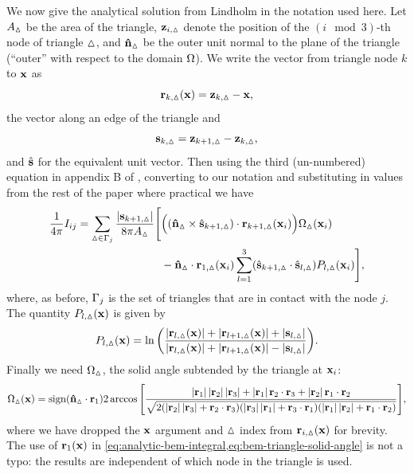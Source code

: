 We now give the analytical solution from Lindholm in the notation used here.
Let $A_\vartriangle$ be the area of the triangle, $\boldsymbol{\mathrm{z}}_{i,\vartriangle}$ denote the position of the $(i \mod 3)$-th node of triangle $\vartriangle$, and $\boldsymbol{\mathrm{\hat{n}}}_\vartriangle$ be the outer unit normal to the plane of the triangle (``outer'' with respect to the domain $\Omega$).
We write the vector from triangle node $k$ to $\boldsymbol{\mathrm{x}}$ as
\begin{equation}
  \boldsymbol{\mathrm{r}}_{k,\vartriangle}(\boldsymbol{\mathrm{x}}) = \boldsymbol{\mathrm{z}}_{k,\vartriangle} - \boldsymbol{\mathrm{x}},
\end{equation}
the vector along an edge of the triangle and
\begin{equation}
  {\boldsymbol{\mathrm{s}}}_{k,\vartriangle} = \boldsymbol{\mathrm{z}}_{k+1,\vartriangle} - \boldsymbol{\mathrm{z}}_{k,\vartriangle},
\end{equation}
and ${\hat{\mathbf{s}}}$ for the equivalent unit vector.
Then using the third (un-numbered) equation in appendix B of \cite{Lindholm1984}, converting to our notation and substituting in values from the rest of the paper where practical we have
\begin{equation}
  \begin{aligned}
    \label{eq:analytic-bem-integral}
    \frac{1}{4\pi}\bmint = \sum_{\tri \in \boundd_j} \frac{\abs{\sv_{k+1,\tri} }}{8 \pi A_\tri}
    \Bigg[&
      \Big( (\nv_\tri \times \svu_{k+1,\tri}) \cdot \rv_{k+1,\tri}(\xv_i)\Big) \Omega_\tri(\xv_i) \\
      &- \nv_\tri \cdot \rv_{1,\tri}(\xv_i) \sum_{l=1}^{3}
      (\svu_{k+1,\tri} \cdot \svu_{l,\tri}) P_{l,\tri}(\xv_i)
    \Bigg],
  \end{aligned}
\end{equation}
where, as before, ${\Gamma}_j$ is the set of triangles that are in contact with the node $j$.
The quantity $P_{l,\vartriangle}(\boldsymbol{\mathrm{x}})$ is given by
\begin{equation}
  P_{l,\vartriangle}(\boldsymbol{\mathrm{x}}) = \ln{\left( \frac{\left|{\boldsymbol{\mathrm{r}}_{l,\vartriangle}(\boldsymbol{\mathrm{x}})} \right| + \left|{\boldsymbol{\mathrm{r}}_{l+1,\vartriangle}(\boldsymbol{\mathrm{x}})} \right| + \left|{{\boldsymbol{\mathrm{s}}}_{l,\vartriangle}} \right|}
    {\left|{\boldsymbol{\mathrm{r}}_{l,\vartriangle}(\boldsymbol{\mathrm{x}})} \right| + \left|{\boldsymbol{\mathrm{r}}_{l+1,\vartriangle}(\boldsymbol{\mathrm{x}})} \right| - \left|{{\boldsymbol{\mathrm{s}}}_{l,\vartriangle}} \right|} \right)}.
\end{equation}
Finally we need $\Omega_\vartriangle$, the solid angle subtended by the triangle at $\boldsymbol{\mathrm{x}}_i$:
\begin{equation}
  \label{eq:bem-triangle-solid-angle}
  \Omega_\tri(\xv) = \text{sign}(\nv_\tri \cdot \rv_1) 2 \arccos\bigs{\frac
    {\abs{\rv_1}\abs{\rv_2}\abs{\rv_3} + \abs{\rv_1} \rv_2\cdot\rv_3 + \abs{\rv_2}\rv_1\cdot \rv_2}
    {\sqrt{2(\abs{\rv_2}\abs{\rv_3} + \rv_2\cdot\rv_3)
        (\abs{\rv_3}\abs{\rv_1} + \rv_3\cdot\rv_1)
        (\abs{\rv_1}\abs{\rv_2} + \rv_1\cdot\rv_2)}}},
\end{equation}
where we have dropped the $\boldsymbol{\mathrm{x}}$ argument and $\vartriangle$ index from $\boldsymbol{\mathrm{r}}_{i,\vartriangle}(\boldsymbol{\mathrm{x}})$ for brevity.
The use of $\boldsymbol{\mathrm{r}}_1(\boldsymbol{\mathrm{x}})$ in \cref{eq:analytic-bem-integral,eq:bem-triangle-solid-angle} is not a typo: the results are independent of which node in the triangle is used.


